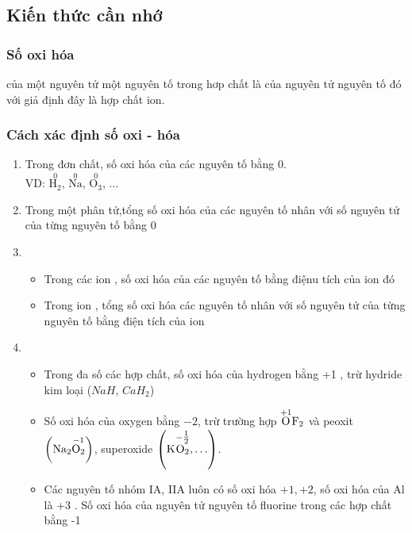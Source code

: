 \subsection{Kiến thức cần nhớ}
\begin{body}
	\subsubsection{Số oxi hóa}
	\begin{dn}
		 của một nguyên tử một nguyên tố trong hơp chất là  của nguyên tử nguyên tố đó với giả định đây là hợp chất ion.
	\end{dn}
	\subsubsection{Cách xác định số oxi - hóa}
	\begin{enumerate}
		\item {}
		Trong đơn chất, số oxi hóa của các nguyên tố bằng 0.\\
		VD: $\overset{0}{\mathrm{H}_{2}}$, $\overset{0}{\mathrm{Na}}$, $\overset{0}{\mathrm{O}_{3}}$, $\ldots$
		\item {}
		Trong một phân tử,tổng số oxi hóa  của các nguyên tố nhân với số nguyên tử của từng nguyên tố bằng 0\\
		\item {} 
		\begin{itemize}
			\item Trong các ion , số oxi hóa của các nguyên tố bằng điệnu tích của ion đó\\
			\item Trong ion , tổng số oxi hóa các nguyên tố nhân với số nguyên tử của từng nguyên tố bằng điện tích của ion
		\end{itemize}
		\item {} \\
		\begin{itemize}
			\item Trong đa số các hợp chất, số oxi hóa của hydrogen bằng +1 , trừ hydride kim loại ($NaH$, $CaH_2$)\\
			\item Số oxi hóa của oxygen bằng $-\mathrm{2}$, trừ trường hợp $\overset{+1}{\mathrm{O}_{}}\overset{\vphantom{-1}}{\mathrm{F}_{2}}$ và peoxit $\left(\overset{\vphantom{+1}}{\mathrm{Na}_{2}}\overset{-1}{\mathrm{O}_{2}}\right)$, superoxide $\left(\overset{\vphantom{+1}}{\mathrm{K}_{}}\overset{-\tfrac{1}{2}}{\mathrm{O}_{2}}, \ldots\right)$.\\
			\item Các nguyên tố nhóm IA, IIA luôn có số oxi hóa $+1,+2$, số oxi hóa của $\mathrm{Al}$ là +3 . Số oxi hóa của nguyên tử nguyên tố fluorine trong các hợp chất bằng -1
		\end{itemize}
	\end{enumerate}

\end{body}
